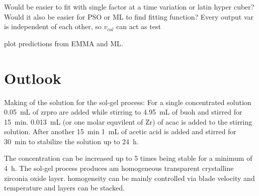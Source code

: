 \documentclass[a4paper]{article}
\newcommand{\ml}[1]{\SI{#1}{\milli\liter}}
\newcommand{\minutes}[1]{\SI{#1}{\minute}}
\newcommand{\h}[1]{\SI{#1}{\hour}}
\begin{document}
Would be easier to fit with single factor at a time variation or latin hyper cuber?
Would it also be easier for PSO or ML to find fitting function?
Every output var is independent of each other, so $v_{cal}$ can act as test 

plot predictions from EMMA and ML.

\section{Outlook}

Making of the solution for the sol-gel process:
For a single concentrated solution \ml{0.05} of \gls{zrpro} are added while stirring to \ml{4.95} of \gls{buoh} and stirred for \minutes{15}. 
\ml{0.013} (or one molar equvilent of Zr) of \gls{acac} is added to the stirring solution. 
After another \minutes{15} \ml{1} of acetic acid is added and stirred for \minutes{30} to stabilize the solution up to \h{24}. 

The concentration can be increased up to 5 times being stable for a minimum of \h{4}. 
The sol-gel process produces am homogeneous transparent crystalline zirconia oxide layer. 
homogeneity can be mainly controlled via blade velocity and temperature and layers can be stacked.



\end{document}
